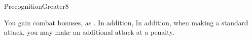 \begin{spellsection}{Precognition}{Greater}{8}
\begin{spellheader}
\end{spellheader}
\begin{spellcontent}
    \begin{spelltargetinginfo}
    \end{spelltargetinginfo}
    \begin{spelleffects}
        \spelleffect You gain combat bonuses, as . In addition, In addition, when making a standard attack, you may make an additional attack at a  penalty.
        \spelldur \durshort \dismissable
    \end{spelleffects}
\end{spellcontent}
\begin{spellfooter}
\end{spellfooter}
\end{spellsection}

